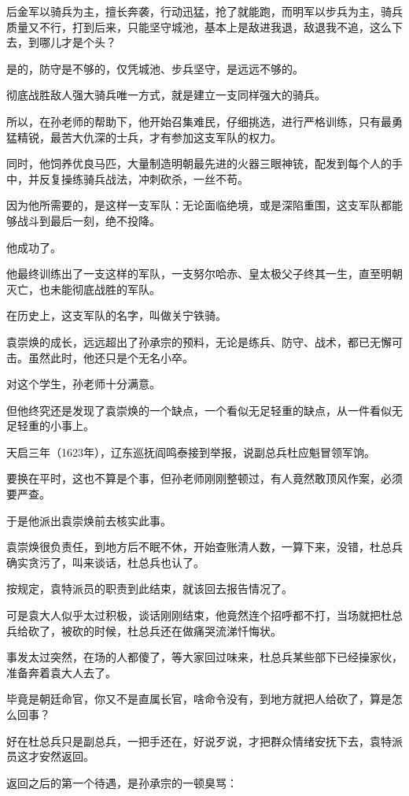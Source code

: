 \begin{multicols}{\theparacolNo}
后金军以骑兵为主，擅长奔袭，行动迅猛，抢了就能跑，而明军以步兵为主，骑兵质量又不行，打到后来，只能坚守城池，基本上是敌进我退，敌退我不追，这么下去，到哪儿才是个头？

是的，防守是不够的，仅凭城池、步兵坚守，是远远不够的。

彻底战胜敌人强大骑兵唯一方式，就是建立一支同样强大的骑兵。

所以，在孙老师的帮助下，他开始召集难民，仔细挑选，进行严格训练，只有最勇猛精锐，最苦大仇深的士兵，才有参加这支军队的权力。

同时，他饲养优良马匹，大量制造明朝最先进的火器三眼神铳，配发到每个人的手中，并反复操练骑兵战法，冲刺砍杀，一丝不苟。

因为他所需要的，是这样一支军队：无论面临绝境，或是深陷重围，这支军队都能够战斗到最后一刻，绝不投降。

他成功了。

他最终训练出了一支这样的军队，一支努尔哈赤、皇太极父子终其一生，直至明朝灭亡，也未能彻底战胜的军队。

在历史上，这支军队的名字，叫做关宁铁骑。

袁崇焕的成长，远远超出了孙承宗的预料，无论是练兵、防守、战术，都已无懈可击。虽然此时，他还只是个无名小卒。

对这个学生，孙老师十分满意。

但他终究还是发现了袁崇焕的一个缺点，一个看似无足轻重的缺点，从一件看似无足轻重的小事上。

天启三年（1623年），辽东巡抚阎鸣泰接到举报，说副总兵杜应魁冒领军饷。

要换在平时，这也不算是个事，但孙老师刚刚整顿过，有人竟然敢顶风作案，必须要严查。

于是他派出袁崇焕前去核实此事。

袁崇焕很负责任，到地方后不眠不休，开始查账清人数，一算下来，没错，杜总兵确实贪污了，叫来谈话，杜总兵也认了。

按规定，袁特派员的职责到此结束，就该回去报告情况了。

可是袁大人似乎太过积极，谈话刚刚结束，他竟然连个招呼都不打，当场就把杜总兵给砍了，被砍的时候，杜总兵还在做痛哭流涕忏悔状。

事发太过突然，在场的人都傻了，等大家回过味来，杜总兵某些部下已经操家伙，准备奔着袁大人去了。

毕竟是朝廷命官，你又不是直属长官，啥命令没有，到地方就把人给砍了，算是怎么回事？

好在杜总兵只是副总兵，一把手还在，好说歹说，才把群众情绪安抚下去，袁特派员这才安然返回。

返回之后的第一个待遇，是孙承宗的一顿臭骂：


\end{multicols}
